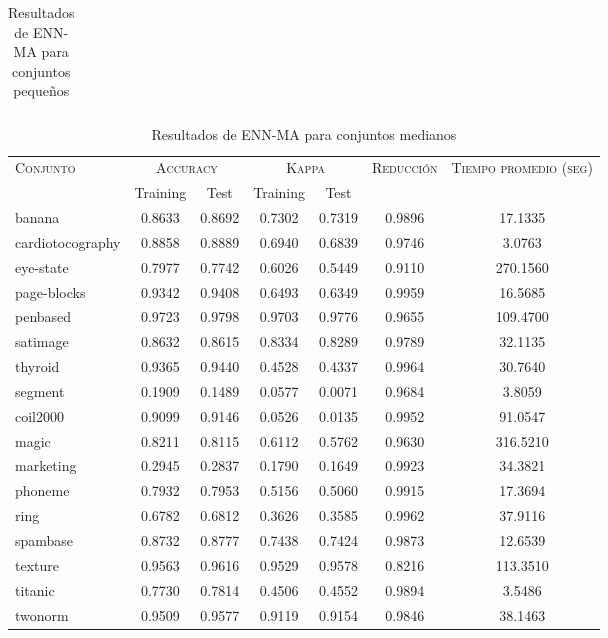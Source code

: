 \begin{table}[]
\begin{tabular}{l c c c c c c}
\hline
\end{tabular}
\caption{Resultados de ENN-MA para conjuntos pequeños }
\label{res-peq-ENN-MA}
\end{table}


\begin{table}[]
\centering
\begin{tabular}{l c c c c c c}
\hline
\multirow{2}{*}{\textsc{Conjunto}}
	& \multicolumn{2}{c}{\textsc{Accuracy}}
	& \multicolumn{2}{c}{\textsc{Kappa}}
	& \textsc{Reducción}
	& \textsc{Tiempo promedio (seg)} \\
	& Training & Test
	& Training & Test \\ 
\hline
\hline

banana & 0.8633 & 0.8692 & 0.7302 & 0.7319 & 0.9896 & 17.1335 \\
cardiotocography & 0.8858 & 0.8889 & 0.6940 & 0.6839 & 0.9746 & 3.0763 \\
eye-state & 0.7977 & 0.7742 & 0.6026 & 0.5449 & 0.9110 & 270.1560 \\
page-blocks & 0.9342 & 0.9408 & 0.6493 & 0.6349 & 0.9959 & 16.5685 \\
penbased & 0.9723 & 0.9798 & 0.9703 & 0.9776 & 0.9655 & 109.4700 \\
satimage & 0.8632 & 0.8615 & 0.8334 & 0.8289 & 0.9789 & 32.1135 \\
thyroid & 0.9365 & 0.9440 & 0.4528 & 0.4337 & 0.9964 & 30.7640 \\
segment & 0.1909 & 0.1489 & 0.0577 & 0.0071 & 0.9684 & 3.8059 \\
coil2000 & 0.9099 & 0.9146 & 0.0526 & 0.0135 & 0.9952 & 91.0547 \\
magic & 0.8211 & 0.8115 & 0.6112 & 0.5762 & 0.9630 & 316.5210 \\
marketing & 0.2945 & 0.2837 & 0.1790 & 0.1649 & 0.9923 & 34.3821 \\
phoneme & 0.7932 & 0.7953 & 0.5156 & 0.5060 & 0.9915 & 17.3694 \\
ring & 0.6782 & 0.6812 & 0.3626 & 0.3585 & 0.9962 & 37.9116 \\
spambase & 0.8732 & 0.8777 & 0.7438 & 0.7424 & 0.9873 & 12.6539 \\
texture & 0.9563 & 0.9616 & 0.9529 & 0.9578 & 0.8216 & 113.3510 \\
titanic & 0.7730 & 0.7814 & 0.4506 & 0.4552 & 0.9894 & 3.5486 \\
twonorm & 0.9509 & 0.9577 & 0.9119 & 0.9154 & 0.9846 & 38.1463 \\

\hline
\end{tabular}
\caption{Resultados de ENN-MA para conjuntos medianos }
\label{res-med-ENN-MA}
\end{table}


